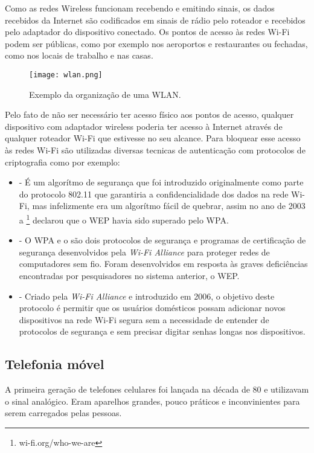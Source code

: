 Como as redes Wireless funcionam recebendo e emitindo sinais, os dados recebidos da Internet são codificados em sinais de rádio pelo roteador e recebidos pelo adaptador do dispositivo conectado.
Os pontos de acesso às redes Wi-Fi podem ser públicas, como por exemplo nos aeroportos e restaurantes ou fechadas, como nos locais de trabalho e nas casas.

\begin{figure}[!htb]
	\centering
	\texttt{[image: wlan.png]} %
	\caption[Exemplo da organização de uma WLAN]{Exemplo da organização de uma WLAN.}
	\label{fig:wlan}
\end{figure}

Pelo fato de não ser necessário ter acesso físico aos pontos de acesso, qualquer dispositivo com adaptador wireless poderia ter acesso à Internet através de qualquer roteador Wi-Fi que estivesse no seu alcance. Para bloquear esse acesso às redes Wi-Fi são utilizadas diversas tecnicas de autenticação com protocolos de criptografia como por exemplo:
\begin{itemize}
  \item {}
  - É um algorítmo de segurança que foi introduzido originalmente como parte do protocolo 802.11 que garantiria a confidencialidade dos dados na rede Wi-Fi, mas infelizmente era um algorítmo fácil de quebrar, assim no ano de 2003 a  \footnote{wi-fi.org/who-we-are} declarou que o WEP havia sido superado pelo WPA.
  \item {}
  - O WPA e o  são dois protocolos de segurança e programas de certificação de segurança desenvolvidos pela \textit{Wi-Fi Alliance} para proteger redes de computadores sem fio. Foram desenvolvidos em resposta às graves deficiências encontradas por pesquisadores no sistema anterior, o WEP.
  \item {}
  - Criado pela \textit{Wi-Fi Alliance} e introduzido em 2006, o objetivo deste protocolo é permitir que os usuários domésticos
  possam adicionar novos dispositivos na rede Wi-Fi segura sem a necessidade de entender de protocolos de segurança e sem precisar digitar senhas longas nos dispositivos.
\end{itemize}

\subsection{Telefonia móvel}
A primeira geração de telefones celulares foi lançada na década de 80 e utilizavam o sinal analógico. Eram aparelhos grandes, pouco práticos e inconvinientes para serem carregados pelas pessoas.

